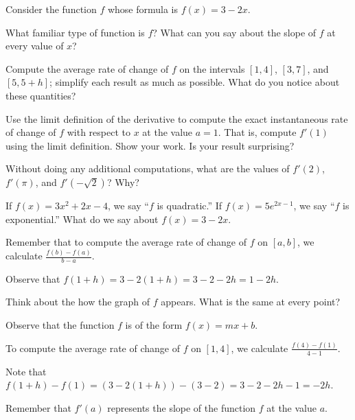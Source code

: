\begin{activity} \label{A:1.3.1}
Consider the function $f$ whose formula is $\displaystyle f(x) = 3 - 2x$.
\ba
	\item What familiar type of function is $f$?  What can you say about the slope of $f$ at every value of $x$?
	\item Compute the average rate of change of $f$ on the intervals $[1,4]$, $[3,7]$, and $[5,5+h]$; simplify each result as much as possible.  What do you notice about these quantities?
	\item Use the limit definition of the derivative to compute the exact instantaneous rate of change of $f$ with respect to $x$ at the value $a = 1$.  That is, compute $f'(1)$ using the limit definition.  Show your work.  Is your result surprising?
	\item Without doing any additional computations, what are the values of $f'(2)$, $f'(\pi)$, and $f'(-\sqrt{2})$?  Why?
\ea
\end{activity}
\begin{smallhint}
\ba
	\item If $f(x) = 3x^2 + 2x - 4$, we say ``$f$ is quadratic.''  If $f(x) = 5 e^{2x-1}$, we say ``$f$ is exponential.''  What do we say about $f(x) = 3-2x$.  
	\item Remember that to compute the average rate of change of $f$ on $[a,b]$, we calculate $\frac{f(b)-f(a)}{b-a}$.
	\item Observe that $f(1+h) = 3 - 2(1+h) = 3 - 2 - 2h = 1 - 2h$.
	\item Think about the how the graph of $f$ appears.  What is the same at every point?
\ea
\end{smallhint}
\begin{bighint}
\ba
	\item Observe that the function $f$ is of the form $f(x) = mx + b$.
	\item To compute the average rate of change of $f$ on $[1,4]$, we calculate $\frac{f(4)-f(1)}{4-1}$.
	\item Note that $f(1+h) - f(1) = (3 - 2(1+h)) - (3-2) = 3 - 2 - 2h - 1 = -2h$.
	\item Remember that $f'(a)$ represents the slope of the function $f$ at the value $a$.
\ea
\end{bighint}
